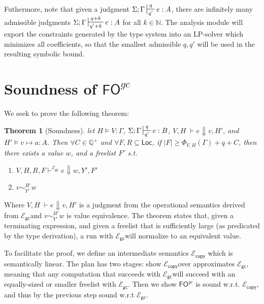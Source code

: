 \documentclass{easychair}
\newtheorem{theorem}{Theorem}
\newcommand{\ms}[1]{\ensuremath{\mathsf{#1}}}
\newcommand{\veq}[4]{#3 \sim^{#1}_{#2} #4}
\newcommand{\fogc}{\ms{FO}^{gc}}
\newcommand{\gcSem}{\ensuremath{\mathcal{E}_{\ms{gc}}}}
\newcommand{\copySem}{\ensuremath{\mathcal{E}_{\ms{copy}}}}
\theoremstyle{definition}
\begin{document}
Futhermore, note that given a judgment $\Sigma;\Gamma \sststile{q'}{q} e : A$, there are 
infinitely many admissible judgments $\Sigma;\Gamma \sststile{q' + k}{q + k} e : A$ 
for all $k \in \mathbb{N}$. The analysis module will export the constraints generated 
by the type system into an LP-solver which minimizes all coefficients, so that the 
smallest admissible $q,q'$ will be used in the resulting symbolic bound.

\section{Soundness of $\fogc$}

We seek to prove the following theorem: 

\begin{theorem}[Soundness]
\label{itm:soundness} let $H \vDash V : \Gamma$, $\Sigma; \Gamma \sststile{q'}{q} e : B$,
$V,H \; \vdash e \Downarrow v, H'$, and $H' \vDash v \mapsto a : A$.
Then $\forall C \in \mathbb{Q}^{+}$ and $\forall F,R \subseteq \ms{Loc}$,
if $|F| \ge \Phi_{V,H}(\Gamma) + q + C$,
then there exists a value $w$, and a freelist $F'$ s.t.
\begin{enumerate}
	\item $V,H,R,F \vdash^{\gcSem} e \Downarrow w, Y', F'$
	\item $\veq{H'}{Y'}{v}{w}$
\end{enumerate}
\end{theorem}

Where $V,H \; \vdash e \Downarrow v, H'$ is a judgment from the operational semantics
derived from \gcSem and $\veq{H'}{Y'}{v}{w}$ is value equivalence. The theorem states that,
given a terminating expression,
and given a freelist that is sufficiently large (as predicated by the type derivation), 
a run with \gcSem will normalize to an equivalent value.

To facilitate the proof, we define an intermediate semantics \copySem 
which is semantically linear. The plan has two stages: show \copySem over 
approximates \gcSem, meaning that any computation that succeeds with \gcSem will succeed with 
an equally-sized or smaller freelist with \gcSem. Then we 
show $\fogc$ is sound w.r.t. \copySem, and thus by the previous step sound w.r.t \gcSem.
\end{document}
